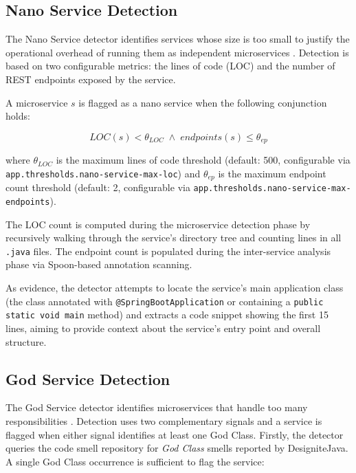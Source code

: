 \subsection{Nano Service Detection}
\label{subsec:detect-nano-service}

\par The Nano Service detector identifies services whose size is too small to justify the operational overhead of running them as independent microservices \cite{Taibi2018}. Detection is based on two configurable metrics: the lines of code (LOC) and the number of REST endpoints exposed by the service.

A microservice $s$ is flagged as a nano service when the following conjunction holds:

\begin{equation}
    \mathit{LOC}(s) < \theta_{\mathit{LOC}} \;\wedge\; \mathit{endpoints}(s) \leq \theta_{\mathit{ep}}
    \label{eq:nano-service-detection}
\end{equation}

\noindent where $\theta_{\mathit{LOC}}$ is the maximum lines of code threshold (default: 500, configurable via \texttt{app.\-thresh\-olds.\-nano-service\--max\--loc}) and $\theta_{\mathit{ep}}$ is the maximum endpoint count threshold (default: 2, configurable via \texttt{app.thresholds.nano-service\--max-endpoints}).

The LOC count is computed during the microservice detection phase by recursively walking through the service's directory tree and counting lines in all \texttt{.java} files. The endpoint count is populated during the inter-service analysis phase via Spoon-based annotation scanning.

As evidence, the detector attempts to locate the service's main application class (the class annotated with \texttt{@SpringBootApplication} or containing a \texttt{public static void main} method) and extracts a code snippet showing the first 15 lines, aiming to provide context about the service's entry point and overall structure.

\subsection{God Service Detection}
\label{subsec:detect-god-service}

\par The God Service detector identifies microservices that handle too many responsibilities \cite{Taibi2018}. Detection uses two complementary signals and a service is flagged when either signal identifies at least one God Class. Firstly, the detector queries the code smell repository for \textit{God Class} smells reported by DesigniteJava. A single God Class occurrence is sufficient to flag the service:

